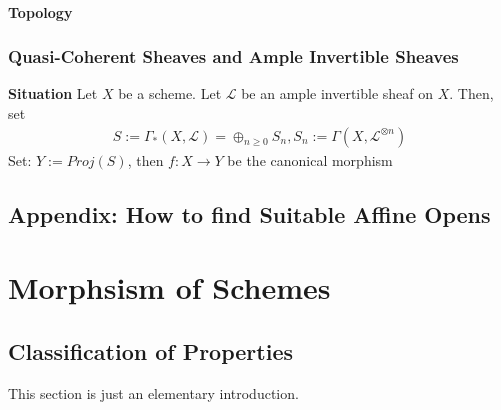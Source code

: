 \documentclass[Total.tex]{subfiles}
\begin{document}
			\subsubsection{Topology}
		\subsection{Quasi-Coherent Sheaves and Ample Invertible Sheaves}
			\textbf{Situation} Let $X$ be a scheme. Let $\mathcal{L}$ be an ample invertible sheaf on $X$. Then, set
			\begin{gather*}
				S:=\Gamma_*(X,\mathcal{L})=\oplus_{n\geq 0} S_n,S_n:=\Gamma(X,\mathcal{L}^{\otimes n})
			\end{gather*}
			Set: $Y:=Proj(S)$, then $f:X\rightarrow Y$ be the canonical morphism
		\section{Appendix: How to find Suitable Affine Opens}
	\chapter{Morphsism of Schemes}
		\section{Classification of Properties}
			This section is just an elementary introduction.
\end{document}
